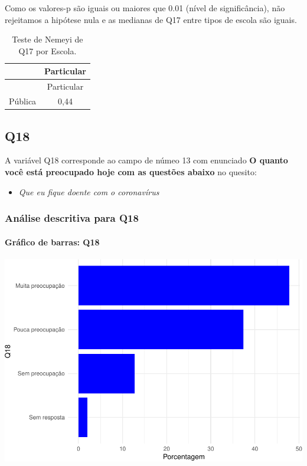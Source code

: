 \documentclass[]{article}
\providecommand{\tightlist}{%
  \setlength{\itemsep}{0pt}\setlength{\parskip}{0pt}}
\let\oldparagraph\paragraph
\renewcommand{\paragraph}[1]{\oldparagraph{#1}\mbox{}}
\begin{document}
Como os valores-p são iguais ou maiores que 0.01 (nível de significância), não rejeitamos a hipótese nula e as medianas de Q17 entre tipos de escola são iguais.

\begin{longtable}[]{@{}lc@{}}
\caption{\label{tab:unnamed-chunk-239}Teste de Nemeyi de Q17 por Escola.}\tabularnewline
\toprule
& Particular\tabularnewline
\midrule
\endfirsthead
\toprule
& Particular\tabularnewline
\midrule
\endhead
Pública & 0,44\tabularnewline
\bottomrule
\end{longtable}

\cleardoublepage

\hypertarget{q18}{%
\subsection{Q18}\label{q18}}

A variável Q18 corresponde ao campo de númeo 13 com enunciado \textbf{O quanto você está preocupado hoje com as questões abaixo} no quesito:

\begin{itemize}
\tightlist
\item
  \emph{Que eu fique doente com o coronavírus}
\end{itemize}

\hypertarget{anuxe1lise-descritiva-para-q18}{%
\subsubsection{Análise descritiva para Q18}\label{anuxe1lise-descritiva-para-q18}}

\hypertarget{gruxe1fico-de-barras-q18}{%
\paragraph{Gráfico de barras: Q18}\label{gruxe1fico-de-barras-q18}}

\begin{center}\includegraphics[width=0.75\linewidth]{relatorio_covid19_files/figure-latex/unnamed-chunk-246-1} \end{center}
\end{document}
